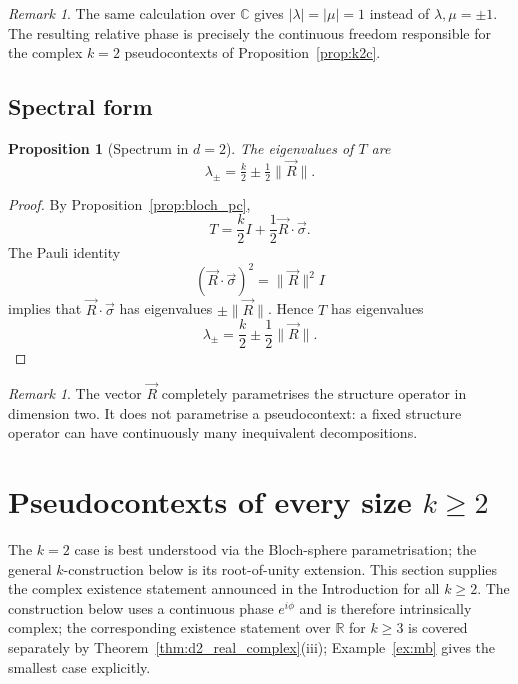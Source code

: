\documentclass[
  twocolumn,
  aps,
  pra,
  floatfix,
  amsmath,amssymb,
  longbibliography
]{revtex4-2}
\newtheorem{proposition}[theorem]{Proposition}
\theoremstyle{definition}
\theoremstyle{remark}
\newtheorem{remark}[theorem]{Remark}
\begin{document}
\begin{remark}\label{rem:realvscomplex_k2}
The same calculation over \(\mathbb C\) gives \(|\lambda|=|\mu|=1\) instead of
\(\lambda,\mu=\pm1\). The resulting relative phase is precisely the continuous freedom responsible for the complex \(k=2\) pseudocontexts of Proposition~\ref{prop:k2c}.
\end{remark}


\subsection{Spectral form}

\begin{proposition}[Spectrum in $d=2$]
\label{prop:d2_spectrum}
The eigenvalues of $T$ are
\[
  \lambda_{\pm}=\tfrac{k}{2}\pm\tfrac{1}{2}\|\vec{R}\|.
\]
\end{proposition}

\begin{proof}
By Proposition~\ref{prop:bloch_pc},
\[
T=\frac{k}{2}I+\frac12\vec R\cdot\vec\sigma.
\]
The Pauli identity
\[
(\vec R\cdot\vec\sigma)^2=\|\vec R\|^2 I
\]
implies that \(\vec R\cdot\vec\sigma\) has eigenvalues
\(\pm\|\vec R\|\). Hence \(T\) has eigenvalues
\[
\lambda_\pm=\frac{k}{2}\pm\frac12\|\vec R\|.
\]
\end{proof}

\begin{remark}
The vector $\vec{R}$ completely parametrises the structure operator in
dimension two.  It does not parametrise a pseudocontext: a fixed
structure operator can have continuously many inequivalent decompositions.
\end{remark}

\section{Pseudocontexts of every size
         \texorpdfstring{$k\ge 2$}{k>=2}}
\label{sec:allk}

The $k=2$ case is best understood via the Bloch-sphere parametrisation;
the general $k$-construction below is its root-of-unity extension.  This
section supplies the complex existence statement announced in the
Introduction
for all $k\ge2$.  The construction below uses a continuous phase
$e^{i\phi}$ and is therefore intrinsically complex; the corresponding
existence statement over $\mathbb{R}$ for $k\ge 3$ is covered separately
by Theorem~\ref{thm:d2_real_complex}(iii); Example~\ref{ex:mb} gives the
smallest case explicitly.
\end{document}
